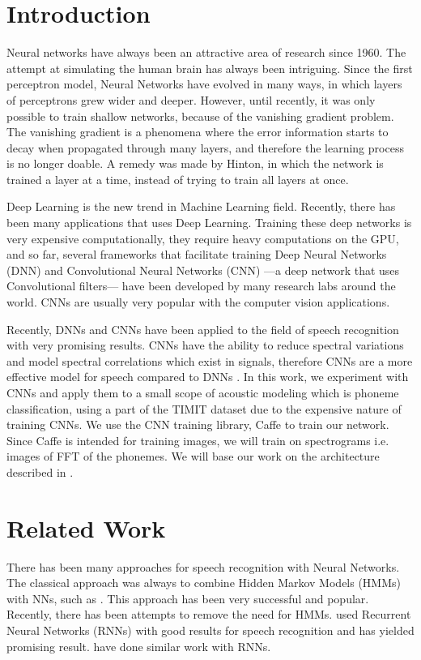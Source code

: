 \documentclass[a4paper,12pt]{article}
\begin{document}
\section{Introduction}

Neural networks have always been an attractive area of research since 1960. The attempt at simulating the human brain has always been intriguing. Since the first perceptron model, Neural Networks have evolved in many ways, in which layers of perceptrons grew wider and deeper. However, until recently, it was only possible to train shallow networks, because of the vanishing gradient problem. The vanishing gradient is a phenomena where the error information starts to decay when propagated through many layers, and therefore the learning process is no longer doable. A remedy was made by Hinton\cite{hinton2006reducing}, in which the network is trained a layer at a time, instead of trying to train all layers at once.

Deep Learning is the new trend in Machine Learning field. Recently, there has been many applications that uses Deep Learning. Training these deep networks is very expensive computationally, they require heavy computations on the GPU, and so far, several frameworks that facilitate training Deep Neural Networks (DNN) and Convolutional Neural Networks (CNN) ---a deep network that uses Convolutional filters--- have been developed by many research labs around the world. CNNs are usually very popular with the computer vision applications.

Recently, DNNs and CNNs have been applied to the field of speech recognition with very promising results. CNNs have the ability to reduce spectral variations and model spectral correlations which exist in signals, therefore CNNs are a more effective model for speech compared to DNNs \cite{sainath2013deep}. In this work, we experiment with CNNs and apply them to a small scope of acoustic modeling which is phoneme classification, using a part of the TIMIT dataset due to the expensive nature of training CNNs. We use the CNN training library, Caffe to train our network. Since Caffe is intended for training images, we will train on spectrograms i.e. images of FFT of the phonemes. We will base our work on the architecture described in \cite{sainath2013deep}.

\section{Related Work}
There has been many approaches for speech recognition with Neural Networks. The classical approach was always to combine Hidden Markov Models (HMMs) with NNs, such as \cite{robinson1994application}. This approach has been very successful and popular. Recently, there has been attempts to remove the need for HMMs. \cite{graves2013speech} used Recurrent Neural Networks (RNNs) with good results for speech recognition and has yielded promising result. \cite{graves2014towards} have done similar work with RNNs.
\end{document}

